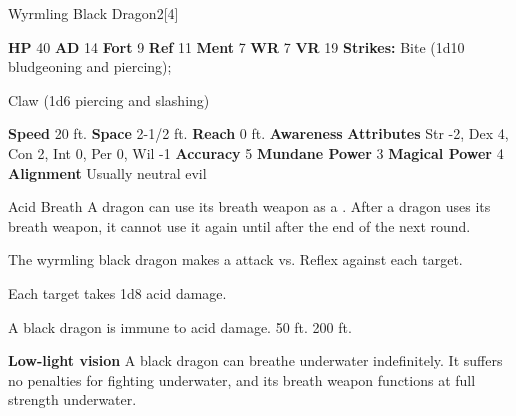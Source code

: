       
  \begin{monsubsection}{Wyrmling Black Dragon}{2}[4]
    \vspace{-1em}\vspace{-1em}
    \vspace{0em}

    
    

    \begin{spellcontent}
      \begin{spelltargetinginfo}
        \pari \textbf{HP} 40 \monsep
          \textbf{AD} 14 \monsep
          \textbf{Fort} 9 \monsep
          \textbf{Ref} 11 \monsep
          \textbf{Ment} 7
        \pari \textbf{WR} 7 \monsep
        \textbf{VR} 19
        \pari \textbf{Strikes:}
            Bite  (1d10 bludgeoning and piercing);
\par Claw  (1d6 piercing and slashing)
      \end{spelltargetinginfo}
    \end{spellcontent}
    \begin{monsterfooter}
      \pari \textbf{Speed} 20 ft. \monsep
        \textbf{Space} 2-1/2 ft. \monsep
        \textbf{Reach} 0 ft.
      \pari \textbf{Awareness} 
      \pari \textbf{Attributes}
        Str -2, Dex 4,
        Con 2, Int 0,
        Per 0, Wil -1
      \pari \textbf{Accuracy} 5 \monsep
        \textbf{Mundane Power} 3 \monsep
      \textbf{Magical Power} 4
      \pari \textbf{Alignment} Usually neutral evil
    \end{monsterfooter}
  \end{monsubsection}
  \begin{freeability}{Acid Breath}
      A dragon can use its breath weapon as a .
      After a dragon uses its breath weapon, it cannot use it again until after the end of the next round.
      \par The wyrmling black dragon makes a  attack
        vs. Reflex against each target.
    
    \hit Each target takes 1d8 acid damage.
    \end{freeability}
  
      
       A black dragon is immune to acid damage.
     50 ft.
     200 ft.
    \par\noindent\textbf{Low-light vision}
        A black dragon can breathe underwater indefinitely.
        It suffers no penalties for fighting underwater, and its breath weapon functions at full strength underwater.
  


